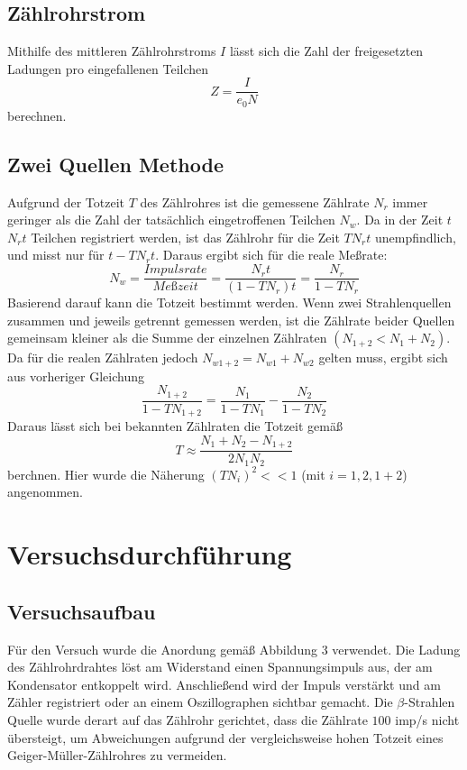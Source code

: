 \documentclass{scrartcl}
\begin{document}
\subsection{Zählrohrstrom}
Mithilfe des mittleren Zählrohrstroms $I$ lässt sich die Zahl der freigesetzten Ladungen pro eingefallenen Teilchen 
\begin{equation}
Z=\frac{I}{e_0N}
\end{equation}
berechnen. 
\subsection{Zwei Quellen Methode}
Aufgrund der Totzeit $T$ des Zählrohres ist die gemessene Zählrate $N_r$ immer geringer als die Zahl der tatsächlich eingetroffenen Teilchen $N_w$. Da in der Zeit $t$ $N_rt$ Teilchen registriert werden, ist das Zählrohr für die Zeit $TN_rt$ unempfindlich, und misst nur für $t-TN_rt$. Daraus ergibt sich für die reale Meßrate:
\begin{equation*}
N_w=\frac{Impulsrate}{Meßzeit}=\frac{N_rt}{(1-TN_r)t}=\frac{N_r}{1-TN_r}
\end{equation*}
Basierend darauf kann die Totzeit bestimmt werden. Wenn zwei Strahlenquellen zusammen und jeweils getrennt gemessen werden, ist die Zählrate beider Quellen gemeinsam kleiner als die Summe der einzelnen Zählraten $(N_{1+2}<N_1+N_2)$. Da für die realen Zählraten jedoch $N_{w1+2}=N_{w1}+N_{w2}$ gelten muss, ergibt sich aus vorheriger Gleichung
\begin{equation*}
\frac{N_{1+2}}{1-TN_{1+2}}=\frac{N_1}{1-TN_1}-\frac{N_2}{1-TN_2}
\end{equation*}
Daraus lässt sich bei bekannten Zählraten die Totzeit gemäß
\begin{equation}
T\approx\frac{N_1+N_2-N_{1+2}}{2N_1N_2}
\end{equation}
berchnen. Hier wurde die Näherung $(TN_i)^2<<1$ (mit $i=1,2,1+2$) angenommen. 
\section{Versuchsdurchführung}
\subsection{Versuchsaufbau}
Für den Versuch wurde die Anordung gemäß Abbildung 3 verwendet. Die Ladung des Zählrohrdrahtes löst am Widerstand einen Spannungsimpuls aus, der am Kondensator entkoppelt wird. Anschließend wird der Impuls verstärkt und am Zähler registriert oder an einem Oszillographen sichtbar gemacht. Die $\beta$-Strahlen Quelle wurde derart auf das Zählrohr gerichtet, dass die Zählrate $100$ imp/s nicht übersteigt, um Abweichungen aufgrund der vergleichsweise hohen Totzeit eines Geiger-Müller-Zählrohres zu vermeiden.
\end{document}
